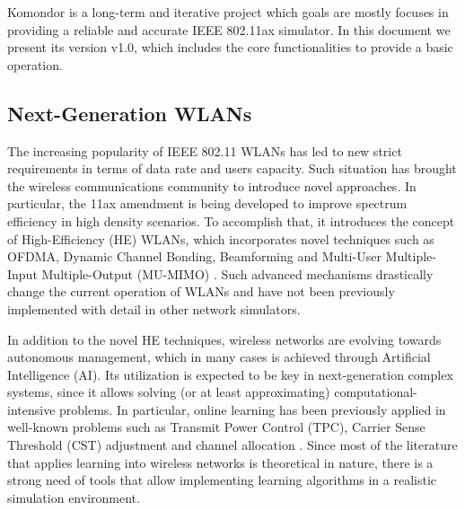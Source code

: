 \documentclass[a4paper]{article}
\begin{document}
Komondor is a long-term and iterative project which goals are mostly focuses in providing a reliable and accurate IEEE 802.11ax simulator. In this document we present its version v1.0, which includes the core functionalities to provide a basic operation.
	
	
	\subsection{Next-Generation WLANs}
	\label{section:ng_wlans}
	The increasing popularity of IEEE 802.11 WLANs has led to new strict requirements in terms of data rate and users capacity. Such situation has brought the wireless communications community to introduce novel approaches. In particular, the 11ax amendment is being developed to improve spectrum efficiency in high density scenarios. To accomplish that, it introduces the concept of High-Efficiency (HE) WLANs, which incorporates novel techniques such as OFDMA, Dynamic Channel Bonding, Beamforming and Multi-User Multiple-Input Multiple-Output (MU-MIMO) \cite{bellalta2016ieee}. Such advanced mechanisms drastically change the current operation of WLANs and have not been previously implemented with detail in other network simulators. 
	
	In addition to the novel HE techniques, wireless networks are evolving towards autonomous management, which in many cases is achieved through Artificial Intelligence (AI). Its utilization is expected to be key in next-generation complex systems, since it allows solving (or at least approximating) computational-intensive problems. In particular, online learning has been previously applied in well-known problems such as Transmit Power Control (TPC), Carrier Sense Threshold (CST) adjustment and channel allocation \cite{wilhelmi2017implications, wilhelmi2017collaborative, maghsudi2015joint, maghsudi2015channel}. Since most of the literature that applies learning into wireless networks is theoretical in nature, there is a strong need of tools that allow implementing learning algorithms in a realistic simulation environment.	
	
\end{document}
